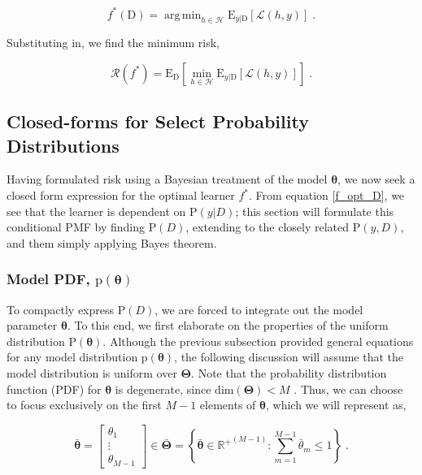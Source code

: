 \documentclass[12pt]{article}
\DeclareMathOperator*{\argmin}{arg\,min}
\begin{document}
\begin{equation} \label{f_opt_D}
f^*(\mathrm{D}) = \argmin_{h \in \mathcal{H}} \text{E}_{y|\mathrm{D}}\left[ \mathcal{L}(h,y) \right] \;.
\end{equation}

Substituting in, we find the minimum risk,

\begin{equation} \label{risk_min}
\mathcal{R}(f^*) = \text{E}_{\mathrm{D}} \left[ \min_{h \in \mathcal{H}} \text{E}_{y|\mathrm{D}}\left[ \mathcal{L}(h,y) \right] \right] \;.
\end{equation}




\subsection{Closed-forms for Select Probability Distributions}

Having formulated risk using a Bayesian treatment of the model $\bm{\theta}$, we now seek a closed form expression for the optimal learner $f^*$. From equation \eqref{f_opt_D}, we see that the learner is dependent on $\text{P}(y|D)$; this section will formulate this conditional PMF by finding $\text{P}(D)$, extending to the closely related $\text{P}(y,D)$, and them simply applying Bayes theorem.


\subsubsection{Model PDF, $\text{p}(\bm{\theta})$}

To compactly express $\text{P}(D)$, we are forced to integrate out the model parameter $\bm{\theta}$. To this end, we first elaborate on the properties of the uniform distribution $\text{P}(\bm{\theta})$. Although the previous subsection provided general equations for any model distribution $\text{p}(\bm{\theta})$, the following discussion will assume that the model distribution is uniform over $\bm{\Theta}$. Note that the probability distribution function (PDF) for $\bm{\theta}$ is degenerate, since $\text{dim}(\bm{\Theta}) < M$ . Thus, we can choose to focus exclusively on the first $M-1$ elements of $\bm{\theta}$, which we will represent as,

\begin{equation}
\bar{\bm{\theta}} = \begin{bmatrix} \theta_1 \\ \vdots \\ \theta_{M-1} \end{bmatrix} \in \bar{\bm{\Theta}} = \left\{ \bar{\bm{\theta}} \in {\mathbb{R}^+}^{(M-1)}: \sum_{m=1}^{M-1} \bar{\theta}_m \leq 1 \right\} \;.
\end{equation}
\end{document}
